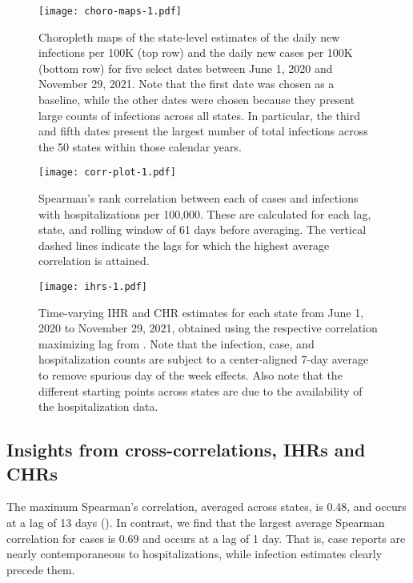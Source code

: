 \begin{figure}[H]
\centering
\texttt{[image: choro-maps-1.pdf]}
\caption{Choropleth maps of the state-level estimates of the daily new
infections per 100K (top row) and the daily new cases per 100K (bottom row) for
five select dates between June 1, 2020 and November 29, 2021. Note that the
first date was chosen as a baseline, while the other dates were chosen because
they present large counts of infections across all states. In particular, the
third and fifth dates present the largest number of total infections across the
50 states within those calendar years.} %
\label{fig:choro_inf_case_rates}
\end{figure}    

\begin{figure}[H]
\centering
\texttt{[image: corr-plot-1.pdf]} 
\caption{Spearman's rank correlation between each of cases and
infections with hospitalizations per 100,000. These are calculated for each lag,
state, and rolling window of 61 days before averaging. The vertical dashed lines
indicate the lags for which the highest average correlation is attained.}
\label{fig:correlations}
\end{figure}

\begin{figure}[H]
\centering
\texttt{[image: ihrs-1.pdf]}
\caption{Time-varying IHR and CHR estimates for each state from June 1, 2020 to
November 29, 2021, obtained using the respective correlation maximizing lag from
. Note that the infection, case, and
hospitalization counts are subject to a center-aligned 7-day average to remove
spurious day of the week effects. Also note that the different starting points
across states are due to the availability of the hospitalization data.}
\label{fig:IHR_7dav}
\end{figure} 

\subsection{Insights from cross-correlations, IHRs and CHRs}
\label{sec:lagged-correlations}

The maximum Spearman's correlation, averaged across states, is 0.48, and occurs
at a lag of 13 days (). In contrast, we find that the
largest average Spearman correlation for cases is 0.69 and occurs at a lag of 1
day. That is, case reports are nearly contemporaneous to hospitalizations, while
infection estimates clearly precede them. 

